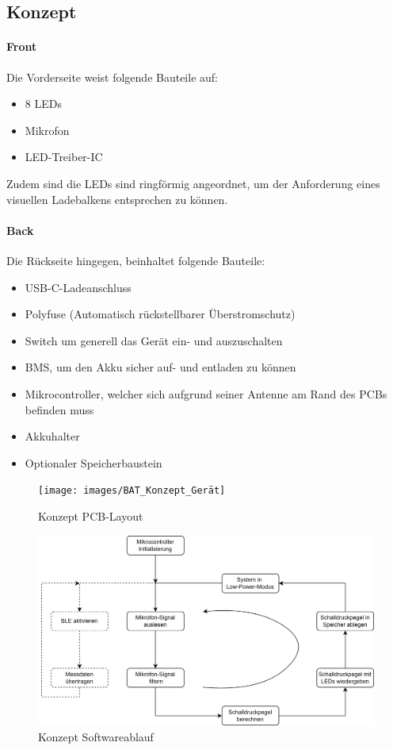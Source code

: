 \documentclass[12pt]{article}
\begin{document}
	\subsection{Konzept}
	\paragraph{Front}
	Die Vorderseite weist folgende Bauteile auf:
	\begin{itemize}
		\item 8 LEDs
		\item Mikrofon
		\item LED-Treiber-IC
	\end{itemize}
	Zudem sind die LEDs sind ringförmig angeordnet, um der Anforderung eines visuellen Ladebalkens entsprechen zu können.
	\paragraph{Back}
	Die Rückseite hingegen, beinhaltet folgende Bauteile:
	\begin{itemize}
		\item USB-C-Ladeanschluss
		\item Polyfuse (Automatisch rückstellbarer Überstromschutz)
		\item Switch um generell das Gerät ein- und auszuschalten
		\item BMS, um den Akku sicher auf- und entladen zu können
		\item Mikrocontroller, welcher sich aufgrund seiner Antenne am Rand des PCBs befinden muss
		\item Akkuhalter
		\item Optionaler Speicherbaustein
	\end{itemize}
	\begin{figure}[H]
		\centering
		\texttt{[image: images/BAT\_Konzept\_Gerät]}
		\caption{Konzept PCB-Layout}
		\label{fig:batkonzeptgerat}
	\end{figure}
	\begin{figure}[H]
		\centering
		\includegraphics[width=0.9\linewidth]{images/BAT_Konzept_Softwareablauf}
		\caption{Konzept Softwareablauf}
		\label{fig:batkonzeptsoftwareablauf}
	\end{figure}
	
\end{document}
